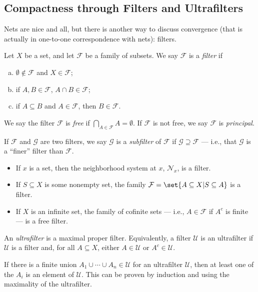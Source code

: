 \documentclass[10pt]{mypackage}
\begin{document}
\subsection{Compactness through Filters and Ultrafilters}%
Nets are nice and all, but there is another way to discuss convergence (that is actually in one-to-one correspondence with nets): filters.
\begin{definition}
  Let $X$ be a set, and let $\mathcal{F}$ be a family of subsets. We say $\mathcal{F}$ is a \textit{filter} if
  \begin{enumerate}[(a)]
    \item $\emptyset\notin \mathcal{F}$ and $X\in \mathcal{F}$;
    \item if $A,B\in \mathcal{F}$, $A\cap B\in \mathcal{F}$;
    \item if $A\subseteq B$ and $A\in \mathcal{F}$, then $B\in \mathcal{F}$.
  \end{enumerate}
  We say the filter $\mathcal{F}$ is \textit{free} if $\bigcap_{A\in \mathcal{F}}A = \emptyset$. If $\mathcal{F}$ is not free, we say $\mathcal{F}$ is \textit{principal}.\newline

  If $\mathcal{F}$ and $\mathcal{G}$ are two filters, we say $\mathcal{G}$ is a \textit{subfilter} of $\mathcal{F}$ if $\mathcal{G}\supseteq \mathcal{F}$ --- i.e., that $\mathcal{G}$ is a ``finer'' filter than $\mathcal{F}$.
\end{definition}
\begin{example}\hfill
  \begin{itemize}
    \item If $x$ is a set, then the neighborhood system at $x$, $\mathcal{N}_x$, is a filter.
    \item If $S\subseteq X$ is some nonempty set, the family $\mathcal{F} = \set{A\subseteq X | S\subseteq A}$ is a filter.
    \item If $X$ is an infinite set, the family of cofinite sets --- i.e., $A\in \mathcal{F}$ if $A^{c}$ is finite --- is a free filter.
  \end{itemize}
\end{example}
\begin{definition}
  An \textit{ultrafilter} is a maximal proper filter. Equivalently, a filter $\mathcal{U}$ is an ultrafilter if $\mathcal{U}$ is a filter and, for all $A\subseteq X$, either $A\in \mathcal{U}$ or $A^{c}\in \mathcal{U}$.
\end{definition}
  If there is a finite union $A_1\cup\cdots\cup A_n\in \mathcal{U}$ for an ultrafilter $\mathcal{U}$, then at least one of the $A_i$ is an element of $\mathcal{U}$. This can be proven by induction and using the maximality of the ultrafilter.
\end{document}
